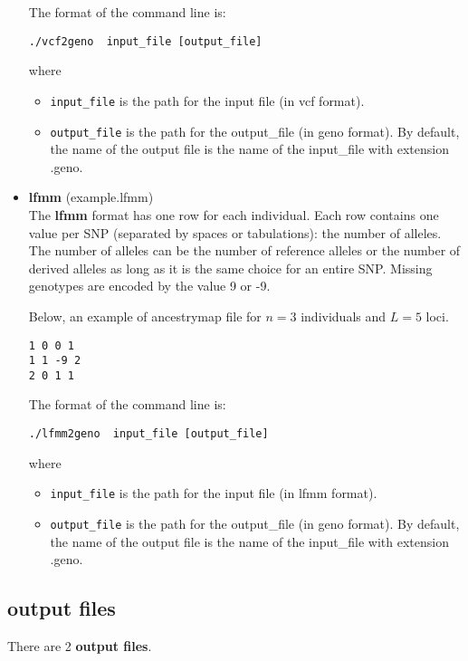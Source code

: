 \documentclass[10pt,a4paper]{article}
\begin{document}
\begin{itemize}
The format of the command line is:
\begin{Verbatim}[frame=single]
./vcf2geno  input_file [output_file]
\end{Verbatim}
where 
\begin{itemize}
\item \verb|input_file| is the path for the input file (in vcf format).
\item \verb|output_file| is the path for the output\_file (in geno format). 
By default, the name of the output file is the name of the input\_file with extension .geno.
\end{itemize}

\item {\bf lfmm} (example.lfmm)\\
The {\bf lfmm} format has one row for each individual. Each row contains one value per SNP (separated by spaces or tabulations): the number of alleles. The number of alleles can be the number of reference alleles or the number of derived alleles as long as it is the same choice for an entire SNP. Missing genotypes are encoded by the value 9 or -9. 


Below, an example of ancestrymap file for $n=3$ individuals and $L=5$ loci.
\begin{center}
\footnotesize
\begin{Verbatim}[frame=single]
1 0 0 1
1 1 -9 2
2 0 1 1
\end{Verbatim}
\end{center}

The format of the command line is:
\begin{Verbatim}[frame=single]
./lfmm2geno  input_file [output_file]
\end{Verbatim}
where 
\begin{itemize}
\item \verb|input_file| is the path for the input file (in lfmm format).
\item \verb|output_file| is the path for the output\_file (in geno format). 
By default, the name of the output file is the name of the input\_file with extension .geno.
\end{itemize}

\end{itemize}




\subsection{output files}
\noindent
There are 2 {\bf output files}.
\end{document}
